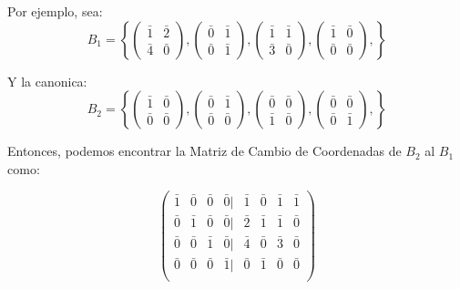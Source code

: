 \documentclass[12pt]{report}                                %
\begin{document}
        Por ejemplo, sea:
        \begin{equation*}
            B_1 = \left\{
                \begin{pmatrix}\bar{1}&\bar{2}\\\bar{4}&\bar{0}\end{pmatrix},
                \begin{pmatrix}\bar{0}&\bar{1}\\\bar{0}&\bar{1}\end{pmatrix},
                \begin{pmatrix}\bar{1}&\bar{1}\\\bar{3}&\bar{0}\end{pmatrix},
                \begin{pmatrix}\bar{1}&\bar{0}\\\bar{0}&\bar{0}\end{pmatrix},
            \right\}
        \end{equation*}

        Y la canonica:
        \begin{equation*}
            B_2 = \left\{
                \begin{pmatrix}\bar{1}&\bar{0}\\\bar{0}&\bar{0}\end{pmatrix},
                \begin{pmatrix}\bar{0}&\bar{1}\\\bar{0}&\bar{0}\end{pmatrix},
                \begin{pmatrix}\bar{0}&\bar{0}\\\bar{1}&\bar{0}\end{pmatrix},
                \begin{pmatrix}\bar{0}&\bar{0}\\\bar{0}&\bar{1}\end{pmatrix},
            \right\}
        \end{equation*}

        Entonces, podemos encontrar la Matriz de Cambio de Coordenadas de $B_2$ al $B_1$ como:


        \begin{equation*}
            \begin{pmatrix}
                \bar{1} & \bar{0} & \bar{0} & \bar{0} | & \bar{1} & \bar{0} & \bar{1} & \bar{1} \\
                \bar{0} & \bar{1} & \bar{0} & \bar{0} | & \bar{2} & \bar{1} & \bar{1} & \bar{0} \\
                \bar{0} & \bar{0} & \bar{1} & \bar{0} | & \bar{4} & \bar{0} & \bar{3} & \bar{0} \\
                \bar{0} & \bar{0} & \bar{0} & \bar{1} | & \bar{0} & \bar{1} & \bar{0} & \bar{0} \\
            \end{pmatrix}
        \end{equation*}
\end{document}
